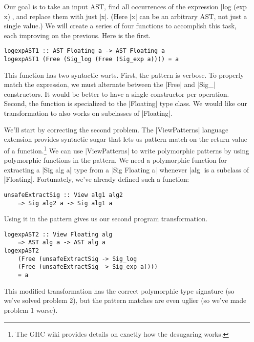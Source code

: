 \documentclass[preprint]{sigplanconf}
\theoremstyle{definition}
\begin{document}
Our goal is to take an input AST,
find all occurrences of the expression |log (exp x)|,
and replace them with just |x|.
(Here |x| can be an arbitrary AST, not just a single value.)
We will create a series of four functions to accomplish this task,
each improving on the previous.
Here is the first.
\begin{lstlisting}
logexpAST1 :: AST Floating a -> AST Floating a
logexpAST1 (Free (Sig_log (Free (Sig_exp a)))) = a
\end{lstlisting}
This function has two syntactic warts.
First, the pattern is verbose.
To properly match the expression, we must alternate between the |Free| and |Sig_| constructors.
It would be better to have a single constructor per operation.
Second, the function is specialized to the |Floating| type class.
We would like our transformation to also works on subclasses of |Floating|.

We'll start by correcting the second problem.
The |ViewPatterns| language extension provides syntactic sugar that lets us pattern match on the return value of a function.\footnote{
    The GHC wiki \cite{viewpatterns} provides details on exactly how the desugaring works.
}
We can use |ViewPatterns| to write polymorphic patterns by using polymorphic functions in the pattern.
We need a polymorphic function for extracting a |Sig alg a| type from a |Sig Floating a| whenever |alg| is a subclass of |Floating|.
Fortunately, we've already defined such a function:
\begin{lstlisting}
unsafeExtractSig :: View alg1 alg2
    => Sig alg2 a -> Sig alg1 a
\end{lstlisting}
Using it in the pattern gives us our second program transformation.
\begin{lstlisting}
logexpAST2 :: View Floating alg
    => AST alg a -> AST alg a
logexpAST2
    (Free (unsafeExtractSig -> Sig_log
    (Free (unsafeExtractSig -> Sig_exp a))))
    = a
\end{lstlisting}
This modified transformation has the correct polymorphic type signature
(so we've solved problem 2),
but the pattern matches are even uglier
(so we've made problem 1 worse).
\end{document}
